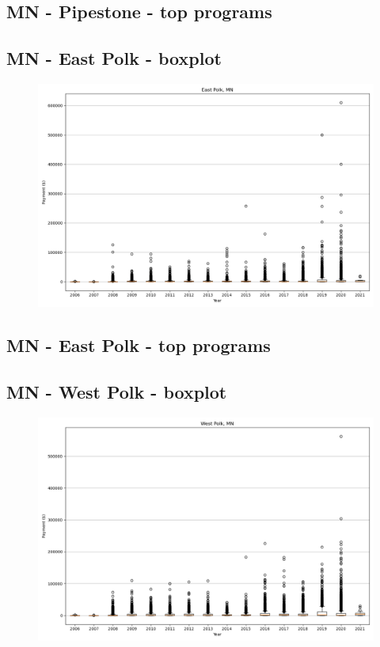 \subsection*{MN - Pipestone - top programs}

\newpage
\subsection*{MN - East Polk - boxplot}
\begin{figure}[h]
\centering
\includegraphics[width=7in]{../output/boxplots/counties/East Polk-MN_boxplot.png}
\end{figure}


\subsection*{MN - East Polk - top programs}

\newpage
\subsection*{MN - West Polk - boxplot}
\begin{figure}[h]
\centering
\includegraphics[width=7in]{../output/boxplots/counties/West Polk-MN_boxplot.png}
\end{figure}


